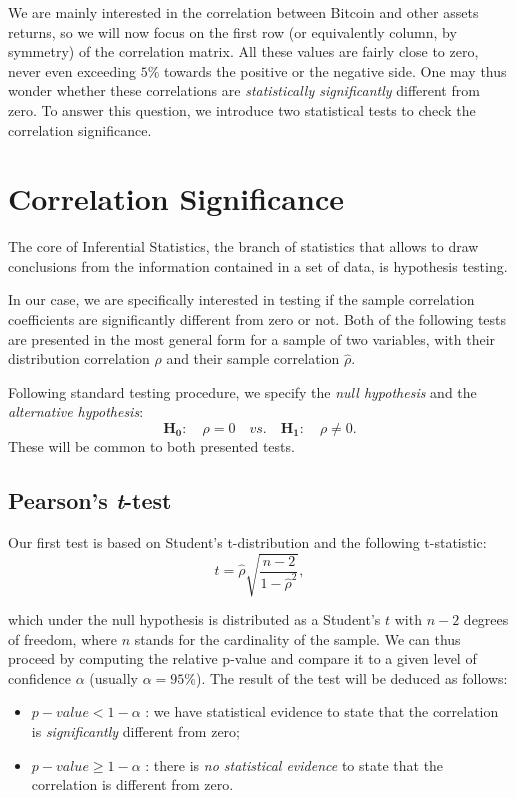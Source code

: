 We are mainly interested in the correlation between Bitcoin and other assets returns, so we will now focus on the first row (or equivalently column, by symmetry) of the correlation matrix.
All these values are fairly close to zero, never even  exceeding $5\%$ towards the positive or the negative side. 
One may thus wonder whether these correlations are \textit{statistically significantly} different from zero.
To answer this question, we introduce two statistical tests to check the correlation significance.


\bigskip
\section{Correlation Significance}
\label{sec:corr_significance}
The core of Inferential Statistics, the branch of statistics that allows to draw conclusions from the information contained in a set of data, is hypothesis testing. 

In our case, we are specifically interested in testing if the sample correlation coefficients are significantly different from zero or not.
Both of the following tests are presented in the most general form for a sample of two variables, with their distribution correlation $\rho$ and their sample correlation $\hat{\rho}$. 

Following standard testing procedure, we specify the \textit{null hypothesis} and the \textit{alternative hypothesis}:
\begin{equation*}
	\mathbf{H_{0}}: \quad \rho = 0 \quad vs. \quad	\mathbf{H_{1}}: \quad \rho \neq 0 .
\end{equation*}
These will be common to both presented tests.

\subsection{Pearson's \textit{t}-test}
Our first test is based on Student's t-distribution and the following t-statistic:
\begin{equation}
	t = \hat{\rho} \sqrt{\frac{n - 2}{1 - \hat{\rho}^2}},
\end{equation} 

\noindent
which under the null hypothesis is distributed as a Student's $t$ with $n-2$ degrees of freedom, where $n$ stands for the cardinality of the sample.
We can thus proceed by computing the relative p-value and compare it to a given level of confidence $\alpha$ (usually $\alpha = 95\%$). 
The result of the test will be deduced as follows:
\begin{itemize}
	\item $p-value < 1 - \alpha$ : we have statistical evidence to state that the correlation is \textit{significantly} different from zero;
	\item $p-value \geq 1 - \alpha$ : there is \textit{no statistical evidence} to state that the correlation is different from zero.
\end{itemize}


